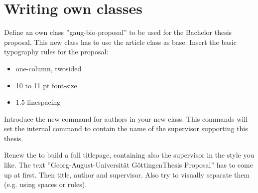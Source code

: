 \section{Writing own classes}

\question Define an own class ''gaug-bio-proposal'' to be used for the
Bachelor thesis proposal. This new class has to use the article class as base.
Insert the basic typography rules for the proposal:
\begin{itemize}
	\item one-column, twosided
	\item 10 to 11 pt font-size
	\item 1.5 linespacing
\end{itemize}

\question Introduce the new command  for authors in your new
class. This commands will set the internal command  to
contain the name of the supervisor supporting this thesis.

\question Renew the  to build a full titlepage, containing also
the supervisor in the style you like. The text ''Georg-August-Universit\"at
G\"ottingenThesis Proposal'' has to come up at first. Then title,
author and supervisor. Also try to visually separate them (e.g. using spaces
or rules).

\begin{solution}
	
\end{solution}
